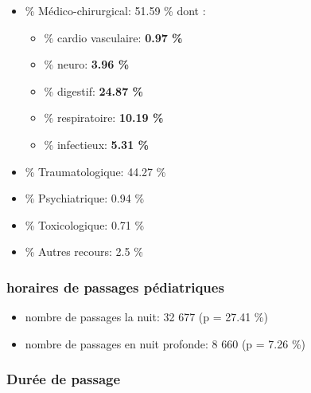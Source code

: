 \documentclass[]{article}
\begin{document}
\begin{itemize}
\item
  \% Médico-chirurgical: 51.59 \% dont :

  \begin{itemize}
  \itemsep1pt\parskip0pt
  \item
    \% cardio vasculaire: \textbf{0.97 \%}
  \item
    \% neuro: \textbf{3.96 \%}
  \item
    \% digestif: \textbf{24.87 \%}
  \item
    \% respiratoire: \textbf{10.19 \%}
  \item
    \% infectieux: \textbf{5.31 \%}
  \end{itemize}
\item
  \% Traumatologique: 44.27 \%
\item
  \% Psychiatrique: 0.94 \%
\item
  \% Toxicologique: 0.71 \%
\item
  \% Autres recours: 2.5 \%
\end{itemize}

\subsubsection{horaires de passages
pédiatriques}\label{horaires-de-passages-pediatriques}

\begin{itemize}
\itemsep1pt\parskip0pt
\item
  nombre de passages la nuit: 32 677 (p = 27.41 \%)
\item
  nombre de passages en nuit profonde: 8 660 (p = 7.26 \%)
\end{itemize}

\subsubsection{Durée de passage}\label{duree-de-passage}
\end{document}
